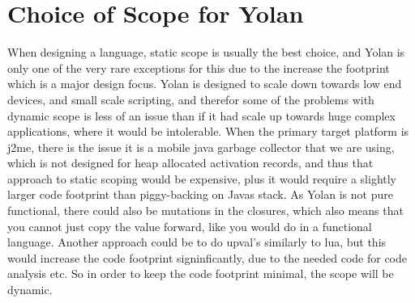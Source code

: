%


\section{Choice of Scope for Yolan}
When designing a language, static scope is usually the best choice,
and Yolan is only one of the very rare exceptions for this
due to the increase the footprint which is a major
design focus.
Yolan is designed to scale down towards low end devices,
and small scale scripting, and therefor some of the problems
with dynamic scope is less of an issue than if it had scale up towards huge complex applications, where it would be intolerable.
When the primary target platform is j2me, there is the issue it is a mobile java garbage collector that we are using, which is not designed for heap allocated activation records, and thus that approach to static scoping would be expensive, plus it would require a slightly larger code footprint than piggy-backing on Javas stack.
As Yolan is not pure functional, there could also be mutations in the closures, which also means that you cannot just copy the value forward, like you would do in a functional language.
Another approach could be to do upval's similarly to lua, but this would increase the code footprint signinficantly, due to the needed code for code analysis etc.
So in order to keep the code footprint minimal, the scope will be dynamic.
